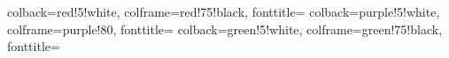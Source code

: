 {colback=red!5!white, colframe=red!75!black, fonttitle=\bfseries}{}
{colback=purple!5!white, colframe=purple!80, fonttitle=\bfseries}{}
{colback=green!5!white, colframe=green!75!black, fonttitle=\bfseries}{}


\usepackage{graphicx}
\graphicspath{ {./images/} }
\usepackage{wrapfig}
\usepackage{tikz}